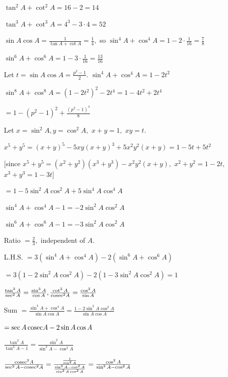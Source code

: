 \item $\tan^2 A + \cot^2 A = 16 - 2 = 14$

    $\tan^3 A + \cot^3 A = 4^3 - 3\cdot 4 = 52$

    $\sin A\cos A = \frac{1}{\tan A + \cot A} = \frac{1}{4},$ so $\sin^4 A + \cos^4 A = 1 - 2\cdot\frac{1}{16} = \frac{7}{8}$

    $\sin^6 A + \cos^6 A = 1 - 3\cdot\frac{1}{16} = \frac{13}{16}$

\item Let $t = \sin A\cos A = \frac{p^2 - 1}{2}$. $\sin^4 A + \cos^4 A = 1 - 2t^2$

    $\sin^8 A + \cos^8 A = (1 - 2t^2)^2 - 2t^4 = 1 - 4t^2 + 2t^4$

    $= 1 - (p^2 - 1)^2 + \frac{(p^2 - 1)^4}{8}$

\item Let $x = \sin^2 A, y = \cos^2 A,$ $x + y = 1,$ $xy = t$.

    $x^5 + y^5 = (x + y)^5 - 5xy(x + y)^3 + 5x^2y^2(x + y) = 1 - 5t + 5t^2$

    [since $x^5 + y^5 = (x^2 + y^2)(x^3 + y^3) - x^2y^2(x + y),$ $x^2 + y^2 = 1 - 2t,$ $x^3 + y^3 = 1 - 3t$]

    $= 1 - 5\sin^2 A\cos^2 A + 5\sin^4 A\cos^4 A$

\item $\sin^4 A + \cos^4 A - 1 = -2\sin^2 A\cos^2 A$

    $\sin^6 A + \cos^6 A - 1 = -3\sin^2 A\cos^2 A$

    Ratio $= \frac{2}{3},$ independent of $A$.

\item L.H.S. $= 3(\sin^4 A + \cos^4 A) - 2(\sin^6 A + \cos^6 A)$

    $= 3(1 - 2\sin^2 A\cos^2 A) - 2(1 - 3\sin^2 A\cos^2 A) = 1$

\item $\frac{\tan^3 A}{\sec^2 A} = \frac{\sin^3 A}{\cos A}, \frac{\cot^3 A}{{\rm cosec}^2 A} = \frac{\cos^3 A}{\sin A}$

    Sum $= \frac{\sin^4 A + \cos^4 A}{\sin A\cos A} = \frac{1 - 2\sin^2 A\cos^2 A}{\sin A\cos A}$

    $= \sec A\,{\rm cosec} A - 2\sin A\cos A$

\item $\frac{\tan^2 A}{\tan^2 A - 1} = \frac{\sin^2 A}{\sin^2 A - \cos^2 A}$

    $\frac{{\rm cosec}^2 A}{\sec^2 A - {\rm cosec}^2 A} = \frac{\frac{1}{\sin^2 A}}{\frac{\sin^2 A - \cos^2 A}{\sin^2 A\cos^2 A}} =
    \frac{\cos^2 A}{\sin^2 A - \cos^2 A}$

